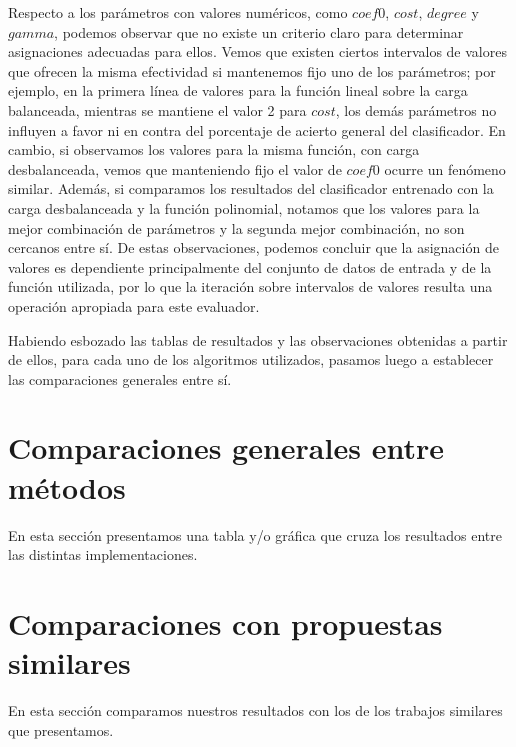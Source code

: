 
Respecto a los par\'ametros con valores num\'ericos, como $coef0$, $cost$, $degree$ y $gamma$, podemos observar que no existe un criterio claro para determinar asignaciones adecuadas para ellos. Vemos que existen ciertos intervalos de valores que ofrecen la misma efectividad si mantenemos fijo uno de los par\'ametros; por ejemplo, en la primera l\'inea de valores para la funci\'on lineal sobre la carga balanceada, mientras se mantiene el valor 2 para $cost$, los dem\'as par\'ametros no influyen a favor ni en contra del porcentaje de acierto general del clasificador. En cambio, si observamos los valores para la misma funci\'on, con carga desbalanceada, vemos que manteniendo fijo el valor de $coef0$ ocurre un fen\'omeno similar. Adem\'as, si comparamos los resultados del clasificador entrenado con la carga desbalanceada y la funci\'on polinomial, notamos que los valores para la mejor combinaci\'on de par\'ametros y la segunda mejor combinaci\'on, no son cercanos entre s\'i. De estas observaciones, podemos concluir que la asignaci\'on de valores es dependiente principalmente del conjunto de datos de entrada y de la funci\'on utilizada, por lo que la iteraci\'on sobre intervalos de valores resulta una operaci\'on apropiada para este evaluador.
\newline

Habiendo esbozado las tablas de resultados y las observaciones obtenidas a partir de ellos, para cada uno de los algoritmos utilizados, pasamos luego a establecer las comparaciones generales entre s\'i.

\section{Comparaciones generales entre m\'etodos}

En esta secci\'on presentamos una tabla y/o gr\'afica que cruza los resultados entre las distintas implementaciones.

\section{Comparaciones con propuestas similares}

En esta secci\'on comparamos nuestros resultados con los de los trabajos similares que presentamos.